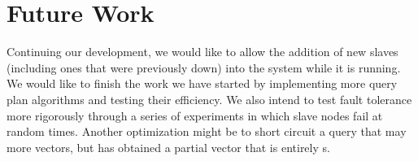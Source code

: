 \section{Future Work}
Continuing our development, we would like to allow the addition of new slaves
(including ones that were previously down) into the system while it is running.
We would like to finish the work we have started by implementing more
query plan algorithms and testing their efficiency. We also intend to test
fault tolerance more rigorously through a series of experiments in which
slave nodes fail at random times. Another optimization might be to short circuit
a query that may  more vectors, but has obtained a partial vector that
is entirely s.
